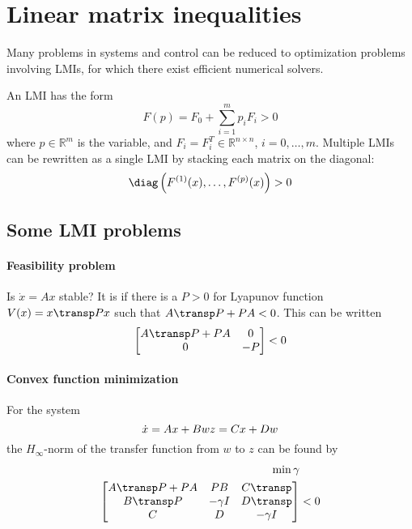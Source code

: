 \section{Linear matrix inequalities}
Many problems in systems and control can be reduced to optimization problems involving LMIs, for which there exist efficient numerical solvers.

An LMI has the form
\begin{equation}
    F(p) = F_0 + \sum_{i=1}^m p_i F_i > 0
\end{equation}
where $p \in \mathbb{R}^m$ is the variable, and $F_i = F_i^T \in \mathbb{R}^{n \times n}$, $i = 0, \dots, m$. Multiple LMIs can be rewritten as a single LMI by stacking each matrix on the diagonal:
\begin{equation}
    \diag \left( F^{(1)}(x), \dots, F^{(p)}(x) \right) > 0
\end{equation}

\subsection{Some LMI problems}
\paragraph{Feasibility problem} Is $\dot{x} = Ax$ stable? It is if there is a $P > 0$ for Lyapunov function $V(x) = x\transp P x$ such that $A\transp P + PA < 0$. This can be written
\begin{equation}
    \begin{bmatrix}
        A\transp P + PA & 0 \\
        0 & -P
    \end{bmatrix}
    < 0
\end{equation}

\paragraph{Convex function minimization} For the system
\begin{equation}
    \dot{x} = Ax + Bw \\
    z = Cx + Dw
\end{equation}
the $H_\infty$-norm of the transfer function from $w$ to $z$ can be found by
\begin{equation}
\begin{split}
    \min \gamma & \\
    \begin{bmatrix}
        A\transp P + PA & PB & C\transp \\
        B\transp P & -\gamma I & D\transp \\
        C & D & -\gamma I
    \end{bmatrix}
    & < 0
\end{split}
\end{equation}


